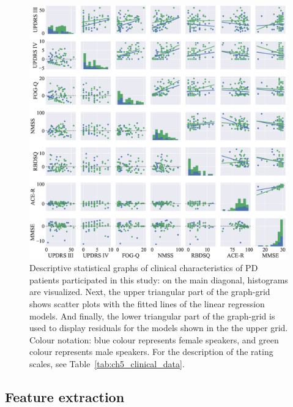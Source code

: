 \begin{figure}[htb!]
	\centering
	\scriptsize
	\includegraphics[width=0.99\textwidth]{pictures/ch5_clinical_statistics.eps}
	\caption[Descriptive statistical graphs of clinical data for PD patients.]{Descriptive statistical graphs of clinical characteristics of PD patients participated in this study: on the main diagonal, histograms are visualized. Next, the upper triangular part of the graph-grid shows scatter plots with the fitted lines of the linear regression models. And finally, the lower triangular part of the graph-grid is used to display residuals for the models shown in the the upper grid. Colour notation: blue colour represents female speakers, and green colour represents male speakers. For the description of the rating scales, see Table~\ref{tab:ch5_clinical_data}.}
	\label{fig:ch5_clinical_statistics}
\end{figure}

\subsection{Feature extraction}
\label{ch5_3_2}

